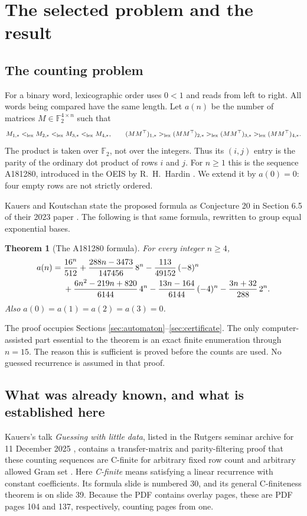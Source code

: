 \documentclass[11pt,letterpaper]{article}
\newtheorem{theorem}{Theorem}[section]
\theoremstyle{definition}
\newcommand{\F}{\mathbb F_2}
\newcommand{\1}{\mathbf 1}
\newcommand{\lex}{<_{\rm lex}}
\newcommand{\revlex}{>_{\rm lex}}
\begin{document}
\section{The selected problem and the result}
\label{sec:problem}

\subsection{The counting problem}
For a binary word, lexicographic order uses $0<1$ and reads from left to right.
All words being compared have the same length. Let $a(n)$ be the number of
matrices $M\in\F^{4\times n}$ such that
\begin{equation}\label{eq:conditions}
 M_{1,*}\lex M_{2,*}\lex M_{3,*}\lex M_{4,*},
 \qquad
 (MM^\top)_{1,*}\revlex (MM^\top)_{2,*}
 \revlex (MM^\top)_{3,*}\revlex (MM^\top)_{4,*}.
\end{equation}
The product is taken over $\F$, not over the integers. Thus its $(i,j)$ entry
is the parity of the ordinary dot product of rows $i$ and $j$.
For $n\ge1$ this is the sequence A181280, introduced in the OEIS by R.\ H.\ Hardin
\cite{oeis}. We extend it by $a(0)=0$: four empty rows are not strictly ordered.

Kauers and Koutschan state the proposed formula as Conjecture 20 in
Section 6.5 of their 2023 paper \cite{kk}. The following is that same formula,
rewritten to group equal exponential bases.

\begin{theorem}[The A181280 formula]\label{thm:main}
For every integer $n\ge4$,
\begin{align}
 a(n)={}&\frac{16^n}{512}
 +\frac{288n-3473}{147456}\,8^n
 -\frac{113}{49152}\,(-8)^n \notag\\
 &+\frac{6n^2-219n+820}{6144}\,4^n
 -\frac{13n-164}{6144}\,(-4)^n
 -\frac{3n+32}{288}\,2^n.
 \label{eq:formula}
\end{align}
Also $a(0)=a(1)=a(2)=a(3)=0$.
\end{theorem}

The proof occupies Sections \ref{sec:automaton}--\ref{sec:certificate}.
The only computer-assisted part essential to the theorem is an exact finite
enumeration through $n=15$. The reason this is sufficient is proved before the
counts are used. No guessed recurrence is assumed in that proof.

\subsection{What was already known, and what is established here}
Kauers's talk \emph{Guessing with little data}, listed in the Rutgers seminar
archive for 11 December 2025 \cite{seminar}, contains a transfer-matrix and
parity-filtering proof that these counting sequences are C-finite for arbitrary
fixed row count and arbitrary allowed Gram set \cite{slides}. Here
\emph{C-finite} means satisfying a linear recurrence with constant coefficients.
Its formula slide is numbered 30, and its general C-finiteness theorem is on
slide 39. Because the PDF contains overlay pages, these are PDF pages 104 and
137, respectively, counting pages from one.
\end{document}

